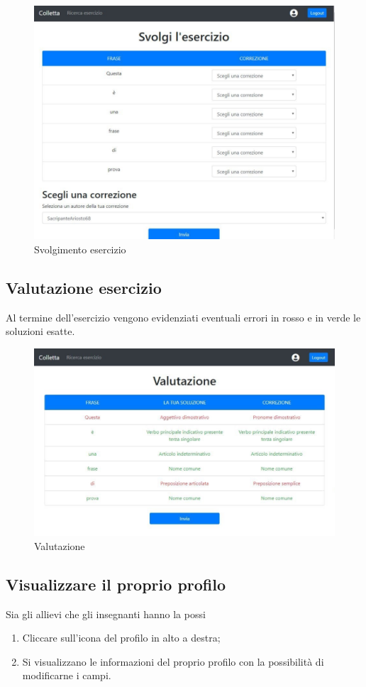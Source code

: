 \documentclass[11pt,a4paper]{article}
\begin{document}
{	\begin{figure}[h]
		\centering
		\includegraphics[scale=0.65]{images/svolgimento.jpg}
		\caption{Svolgimento esercizio}
	\end{figure}

	\subsection{Valutazione esercizio}
	Al termine dell'esercizio vengono evidenziati eventuali errori in rosso e in verde le soluzioni esatte.
		\begin{figure}[h!]
		\centering
		\includegraphics[scale=0.65]{images/valutazione.jpg}
		\caption{Valutazione}
	\end{figure}
	
	\subsection{Visualizzare il proprio profilo}
	Sia gli allievi che gli insegnanti hanno la possi
	\begin{enumerate}
		\item Cliccare sull'icona del profilo in alto a destra;
		\item Si visualizzano le informazioni del proprio profilo con la possibilità di modificarne i campi.
	\end{enumerate}

}
\end{document}
